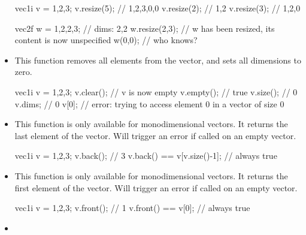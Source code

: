 \documentclass[12pt,a4paper]{report}
\newenvironment{example}
{
    \begin{mdframed}[style=example,frametitle={Example}]
}
{
    \end{mdframed}
}
\begin{document}
\begin{itemize}
\begin{example}
\begin{cppcode}
vec1i v = {1,2,3};
v.resize(5); // {1,2,3,0,0}
v.resize(2); // {1,2}
v.resize(3); // {1,2,0}

vec2f w = {{1,2},{2,3}}; // dims: {2,2}
w.resize(2,3); // w has been resized, its content is now unspecified
w(0,0); // who knows?
\end{cppcode}
\end{example}

\item {}

This function removes all elements from the vector, and sets all dimensions to zero.

\begin{example}
\begin{cppcode}
vec1i v = {1,2,3};
v.clear(); // v is now empty
v.empty(); // true
v.size();  // 0
v.dims;    // {0}
v[0];      // error: trying to access element 0 in a vector of size 0
\end{cppcode}
\end{example}

\item {}

This function is only available for monodimensional vectors. It returns the last element of the vector. Will trigger an error if called on an empty vector.

\begin{example}
\begin{cppcode}
vec1i v = {1,2,3};
v.back(); // 3
v.back() == v[v.size()-1]; // always true
\end{cppcode}
\end{example}

\item {}

This function is only available for monodimensional vectors. It returns the first element of the vector. Will trigger an error if called on an empty vector.

\begin{example}
\begin{cppcode}
vec1i v = {1,2,3};
v.front(); // 1
v.front() == v[0]; // always true
\end{cppcode}
\end{example}

\item {}


\end{itemize}
\end{document}

